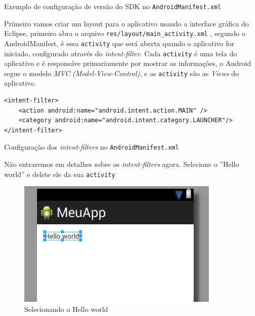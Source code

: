 \documentclass[a4paper,12pt,brazil,doubleside]{book}
\begin{document}
\begin{singlespace}
\begin{listing}[H]
\inputminted[linenos=true,frame=lines, framesep=2mm, tabsize=2,numbersep=5pt]{xml}{../../src/android/firstapp/sdk-manifest.xml}
\label{AndroidManifest.sdk}
\caption{Exemplo de configuração de versão do SDK no \texttt{\textcolor{mygreen}{AndroidManifest.xml}} }
\end{listing}

Primeiro vamos criar um layout para o aplicativo usando a interface gráfica do Eclipse, primeiro abra o arquivo \texttt{\textcolor{mygreen}{res/layout/main\_activity.xml}} , segundo o AndroidManifest, é essa \texttt{activity} que será aberta quando o aplicativo for iniciado, configurado através do \textit{intent-filter}. Cada \texttt{activity} é uma tela do aplicativo e é responsáve primariamente por mostrar as informações, o Android segue o modelo \emph{MVC} \textit{(Model-View-Control)}, e as \texttt{activity} são as \textit{Views} do aplicativo.
\begin{listing}
\begin{verbatim}
<intent-filter>
	<action android:name="android.intent.action.MAIN" />
	<category android:name="android.intent.category.LAUNCHER"/>
</intent-filter>
\end{verbatim}
\caption{Configuração dos \textit{intent-filters} no \texttt{\textcolor{mygreen}{AndroidManifest.xml}} }
\end{listing}

Não entraremos em detalhes sobre os \textit{intent-filters} agora. Selecione o ''Hello world'' e delete ele da sua \texttt{activity}

\begin{figure}[H]
  \centering
  \includegraphics{figuras/3-criando-app.png}
  \caption{Selecionando o Hello world}
  \label{fig:b}
\end{figure}


\end{singlespace}
\end{document}

